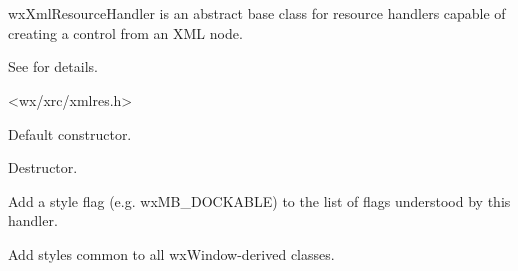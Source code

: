 %
%

\section{}\label{wxxmlresourcehandler}

wxXmlResourceHandler is an abstract base class for resource handlers
capable of creating a control from an XML node.

See  for details.




<wx/xrc/xmlres.h>




\label{wxxmlresourcehandlerctor}


Default constructor.

\label{wxxmlresourcehandlerdtor}


Destructor.

\label{wxxmlresourcehandleraddstyle}


Add a style flag (e.g. wxMB\_DOCKABLE) to the list of flags
understood by this handler.

\label{wxxmlresourcehandleraddwindowstyles}


Add styles common to all wxWindow-derived classes.

\label{wxxmlresourcehandlercanhandle}


